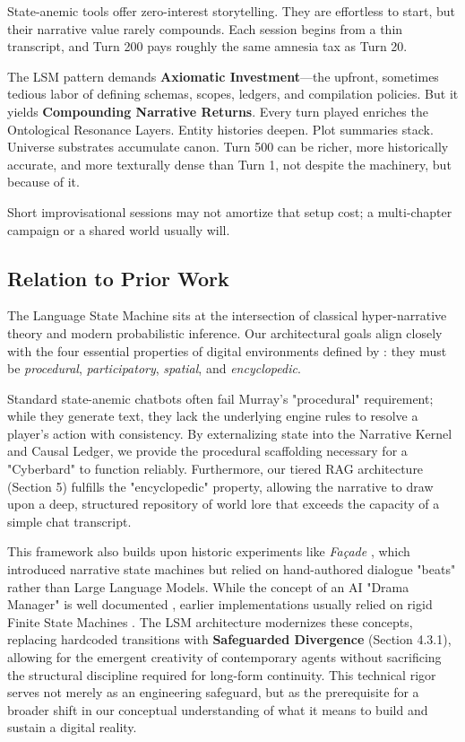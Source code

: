 \documentclass[12pt, a4paper]{article}
\begin{document}
State-anemic tools offer zero-interest storytelling. They are effortless to start, but their narrative value rarely compounds. Each session begins from a thin transcript, and Turn 200 pays roughly the same amnesia tax as Turn 20. 

The LSM pattern demands \textbf{Axiomatic Investment}---the upfront, sometimes tedious labor of defining schemas, scopes, ledgers, and compilation policies. But it yields \textbf{Compounding Narrative Returns}. Every turn played enriches the Ontological Resonance Layers. Entity histories deepen. Plot summaries stack. Universe substrates accumulate canon. Turn 500 can be richer, more historically accurate, and more texturally dense than Turn 1, not despite the machinery, but because of it. 

Short improvisational sessions may not amortize that setup cost; a multi-chapter campaign or a shared world usually will.

\subsection{Relation to Prior Work}

The Language State Machine sits at the intersection of classical hyper-narrative theory and modern probabilistic inference. Our architectural goals align closely with the four essential properties of digital environments defined by \citet{murray1997}: they must be \textit{procedural}, \textit{participatory}, \textit{spatial}, and \textit{encyclopedic}. 

Standard state-anemic chatbots often fail Murray's "procedural" requirement; while they generate text, they lack the underlying engine rules to resolve a player's action with consistency. By externalizing state into the Narrative Kernel and Causal Ledger, we provide the procedural scaffolding necessary for a "Cyberbard" to function reliably. Furthermore, our tiered RAG architecture (Section 5) fulfills the "encyclopedic" property, allowing the narrative to draw upon a deep, structured repository of world lore that exceeds the capacity of a simple chat transcript.

This framework also builds upon historic experiments like \textit{Façade} \citep{mateas2003}, which introduced narrative state machines but relied on hand-authored dialogue "beats" rather than Large Language Models. While the concept of an AI "Drama Manager" is well documented \citep{weydhraad2001}, earlier implementations usually relied on rigid Finite State Machines \citep{buckland2001}. The LSM architecture modernizes these concepts, replacing hardcoded transitions with \textbf{Safeguarded Divergence} (Section 4.3.1), allowing for the emergent creativity of contemporary agents \citep{park2023agents} without sacrificing the structural discipline required for long-form continuity. This technical rigor serves not merely as an engineering safeguard, but as the prerequisite for a broader shift in our conceptual understanding of what it means to build and sustain a digital reality.
\end{document}
